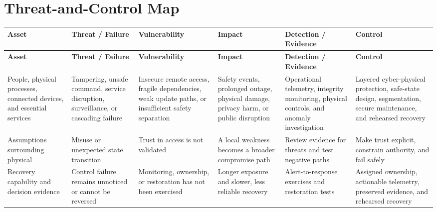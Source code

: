 \documentclass[11pt]{article}
\begin{document}
\section*{Threat-and-Control Map}
\begingroup\scriptsize\setlength{\tabcolsep}{2pt}
\begin{longtable}{>{\RaggedRight\arraybackslash}p{}>{\RaggedRight\arraybackslash}p{}>{\RaggedRight\arraybackslash}p{}>{\RaggedRight\arraybackslash}p{}>{\RaggedRight\arraybackslash}p{}>{\RaggedRight\arraybackslash}p{}}
\toprule\rowcolor{Navy}\color{white}\textbf{Asset} & \color{white}\textbf{Threat / Failure} & \color{white}\textbf{Vulnerability} & \color{white}\textbf{Impact} & \color{white}\textbf{Detection / Evidence} & \color{white}\textbf{Control}\\\midrule
\endfirsthead
\toprule\rowcolor{Navy}\color{white}\textbf{Asset} & \color{white}\textbf{Threat / Failure} & \color{white}\textbf{Vulnerability} & \color{white}\textbf{Impact} & \color{white}\textbf{Detection / Evidence} & \color{white}\textbf{Control}\\\midrule
\endhead
People, physical processes, connected devices, and essential services & Tampering, unsafe command, service disruption, surveillance, or cascading failure & Insecure remote access, fragile dependencies, weak update paths, or insufficient safety separation & Safety events, prolonged outage, physical damage, privacy harm, or public disruption & Operational telemetry, integrity monitoring, physical controls, and anomaly investigation & Layered cyber-physical protection, safe-state design, segmentation, secure maintenance, and rehearsed recovery\\\midrule
Assumptions surrounding physical & Misuse or unexpected state transition & Trust in access is not validated & A local weakness becomes a broader compromise path & Review evidence for threats and test negative paths & Make trust explicit, constrain authority, and fail safely\\\midrule
Recovery capability and decision evidence & Control failure remains unnoticed or cannot be reversed & Monitoring, ownership, or restoration has not been exercised & Longer exposure and slower, less reliable recovery & Alert-to-response exercises and restoration tests & Assigned ownership, actionable telemetry, preserved evidence, and rehearsed recovery\\\midrule
\bottomrule
\end{longtable}
\endgroup
\end{document}
